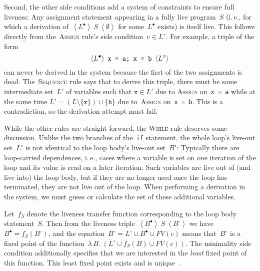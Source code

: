 \documentclass{llncs}
\newcommand{\liveout}[1]{\ensuremath{#1^{\circ}}}
\newcommand{\livein}[1]{\ensuremath{#1^{\bullet}}}
\newcommand{\triple}[3]{\ensuremath{
    \left\langle#1\right\rangle \ #2 \ \left\langle#3\right\rangle
}}
\def\union{\cup}
\begin{document}
Second, the other side conditions add a system of constraints to ensure full
liveness: Any assignment statement appearing in a fully live program~\(S\)
(i.\,e., for which a derivation of~\(\triple{\livein{L}}{S}{\emptyset}\) for
some~\(\livein{L}\) exists) is itself live. This follows directly from
the~\textsc{Assign} rule's side condition~\(v \in \liveout{L}\).
For example, a triple of the form
\[
\triple{\livein{L}}{\mbox{\texttt{x = a; x = b}}}{\liveout{L}}
\]
can never be derived in the system because the first of the two assignments
is dead. The~\textsc{Sequence} rule says that to derive this triple, there
must be some intermediate set~\(L'\) of variables such that \(\mathtt{x} \in
L'\) due to \textsc{Assign} on~\verb|x = a| while at the same time
\(L' = (L \setminus \{\mathtt{x}\}) \union \{\mathtt{b}\}\) due
to~\textsc{Assign} on~\verb|x = b|. This is a contradiction, so the
derivation attempt must fail.

While the other rules are straight-forward, the \textsc{While} rule deserves
some discussion. Unlike the two branches of the~\verb|if| statement, the
whole loop's live-out set~\(\liveout{L}\) is not identical to the loop
body's live-out set~\(\liveout{B}\): Typically there are loop-carried
dependences, i.\,e., cases where a variable is set on one iteration of the
loop and its value is read on a later iteration. Such variables are live out
of (and live into) the loop body, but if they are no longer used once the
loop has terminated, they are not live out of the loop. When performing a
derivation in the system, we must guess or calculate the set of these
additional variables.

Let~\(f_S\) denote the liveness transfer
function corresponding to the loop body statement~\(S\). Then from the
liveness triple~\(\triple{\livein{B}}{S}{\liveout{B}}\) we have~\(\livein{B}
= f_S(\liveout{B})\), and the equation~\(\liveout{B} = \liveout{L} \union
\livein{B} \union FV(c)\) means that~\(\liveout{B}\) is a fixed point of the
function~\(\lambda\,B.\;(\liveout{L} \union f_S(B) \union FV(c))\). The
minimality side condition additionally specifies that we are interested in
the \emph{least} fixed point of this function. This least fixed point exists
and is unique~\cite{nielson.etal-1999}.
\end{document}
